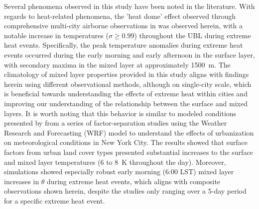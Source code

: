 Several phenomena observed in this study have been noted in the literature. With regards to heat-related phenomena, the 'heat dome' effect observed through comprehensive multi-city airborne observations in \citet{zhang2020} was observed herein, with a notable increase in temperatures ($\sigma \geq 0.99$) throughout the UBL during extreme heat events. Specifically, the peak temperature anomalies during extreme heat events occurred during the early morning and early afternoon in the surface layer, with secondary maxima in the mixed layer at approximately \SI{1500}{\meter}. The climatology of mixed layer properties provided in this study aligns with findings herein using different observational methods, although on single-city scale, which is beneficial towards understanding the effects of extreme heat within cities and improving our understanding of the relationship between the surface and mixed layers. It is worth noting that this behavior is similar to modeled conditions presented by \citet{ortiz2018} from a series of factor-separation studies using the Weather Research and Forecasting (WRF) model to understand the effects of urbanization on meteorological conditions in New York City. The results showed that surface factors from urban land cover types presented substantial increases to the surface and mixed layer temperatures (6 to \SI{8}{\kelvin} throughout the day). Moreover, simulations showed especially robust early morning (6:00 LST) mixed layer increases in $\theta$ during extreme heat events, which aligns with composite observations shown herein, despite the studies only ranging over a 5-day period for a specific extreme heat event.
\\ \\

